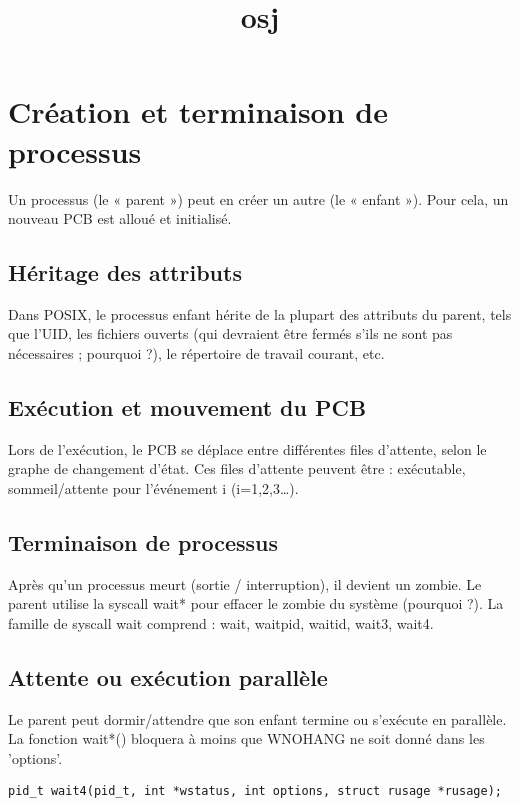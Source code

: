 \documentclass[12pt]{article}
\title{osj}
\author{}
\date{}
\begin{document}
\maketitle
\tableofcontents
\newpage

\section{Création et terminaison de processus}

Un processus (le « parent ») peut en créer un autre (le « enfant »). Pour cela, un nouveau PCB est alloué et initialisé. 

\subsection{Héritage des attributs}

Dans POSIX, le processus enfant hérite de la plupart des attributs du parent, tels que l'UID, les fichiers ouverts (qui devraient être fermés s'ils ne sont pas nécessaires ; pourquoi ?), le répertoire de travail courant, etc.

\subsection{Exécution et mouvement du PCB}

Lors de l'exécution, le PCB se déplace entre différentes files d'attente, selon le graphe de changement d'état. Ces files d'attente peuvent être : exécutable, sommeil/attente pour l'événement i (i=1,2,3…).

\subsection{Terminaison de processus}

Après qu'un processus meurt (sortie / interruption), il devient un zombie. Le parent utilise la syscall wait* pour effacer le zombie du système (pourquoi ?). La famille de syscall wait comprend : wait, waitpid, waitid, wait3, wait4.

\subsection{Attente ou exécution parallèle}

Le parent peut dormir/attendre que son enfant termine ou s'exécute en parallèle. La fonction wait*() bloquera à moins que WNOHANG ne soit donné dans les 'options'.
\begin{lstlisting}
pid_t wait4(pid_t, int *wstatus, int options, struct rusage *rusage);
\end{lstlisting}
\end{document}
